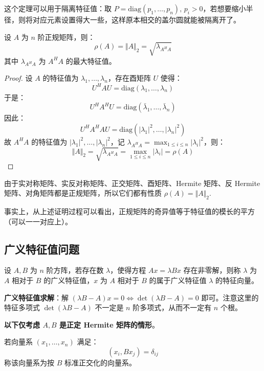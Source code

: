 \begin{remark}
这个定理可以用于隔离特征值：取 $P=\text{diag}(p_1,\ldots,p_n),\,p_i>0$，若想要缩小半径，则将对应元素设置得大一些，这样原本相交的盖尔圆就能被隔离开了。
\end{remark}

\begin{theorem}
设 $A$ 为 $n$ 阶正规矩阵，则：
\[
    \rho(A)=\Vert A\Vert_2=\sqrt{\lambda_{A^HA}}
\]
其中 $\lambda_{A^HA}$ 为 $A^HA$ 的最大特征值。
\end{theorem}
\begin{proof}
设 $A$ 的特征值为 $\lambda_1,\ldots,\lambda_n$，存在酉矩阵 $U$ 使得：
\[
    U^HAU=\text{diag}(\lambda_1,\ldots,\lambda_n)
\]
于是：
\[
    U^HA^HU=\text{diag}(\bar\lambda_1,\ldots,\bar\lambda_n)
\]
因此：
\[
    U^HA^HAU=\text{diag}(|\lambda_1|^2,\ldots,|\lambda_n|^2)
\]
故 $A^HA$ 的特征值为 $|\lambda_1|^2,\ldots,|\lambda_n|^2$，记 $\lambda_{A^HA}=\max_{1\leq i\leq n}|\lambda_i|^2$，则：
\[
    \Vert A\Vert_2=\sqrt{\lambda_{A^HA}}=\max_{1\leq i\leq n}|\lambda_i|=\rho(A)
\]
\end{proof}

\begin{remark}
由于实对称矩阵、实反对称矩阵、正交矩阵、酉矩阵、Hermite 矩阵、反 Hermite 矩阵、对角矩阵都是正规矩阵，所以它们都有性质 $\rho(A)=\Vert A\Vert_2$.
\end{remark}
\begin{remark}
事实上，从上述证明过程可以看出，正规矩阵的奇异值等于特征值的模长的平方（可以一一对应上）。
\end{remark}


\subsection{广义特征值问题}

\begin{definition}[广义特征值]
设 $A,B$ 为 $n$ 阶方阵，若存在数 $\lambda$，使得方程 $Ax=\lambda Bx$ 存在非零解，则称 $\lambda$ 为 $A$ 相对于 $B$ 的广义特征值，$x$ 为 $A$ 相对于 $B$ 的属于广义特征值 $\lambda$ 的特征向量。
\end{definition}

\noindent\textbf{广义特征值求解}：解 $(\lambda B-A)x=0\iff\det(\lambda B-A)=0$ 即可。注意这里的特征多项式 $\det(\lambda B-A)$ 不一定是 $n$ 阶多项式，从而不一定有 $n$ 个根。

\vskip 6pt \noindent\textbf{以下仅考虑 $A,B$ 是正定 Hermite 矩阵的情形}。

\begin{definition}[按 $B$ 标准正交化]
若向量系 $(x_1,\ldots,x_n)$ 满足：
\[
    (x_i,Bx_j)=\delta_{ij}
\]
称该向量系为按 $B$ 标准正交化的向量系。
\end{definition}

